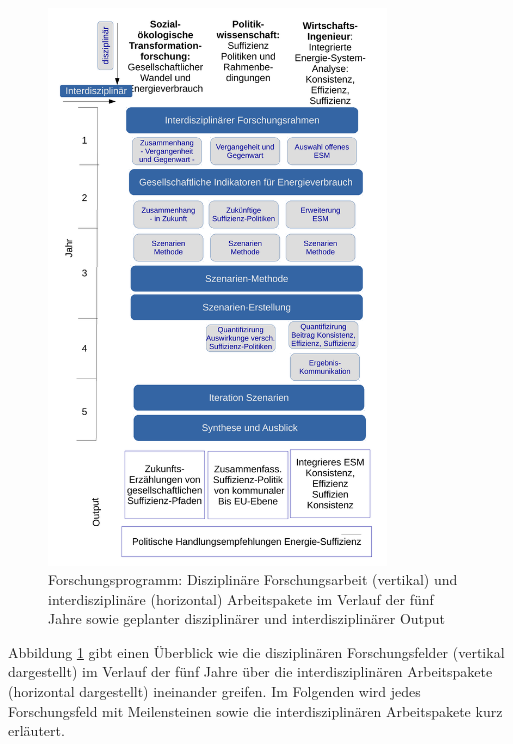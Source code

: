 \documentclass[a4paper,11pt,twoside]{scrartcl}
\begin{document}
\begin{figure}[!h]
    \centering
    \includegraphics[width=0.8\textwidth]{figures/Forschungsarbeit.pdf}
    \caption{Forschungsprogramm: Disziplinäre Forschungsarbeit (vertikal) und  interdisziplinäre (horizontal) Arbeitspakete im Verlauf der fünf Jahre sowie geplanter disziplinärer und interdisziplinärer Output}
    \label{fig:forschungsprogramm}
\end{figure}

Abbildung \ref{fig:forschungsprogramm} gibt einen Überblick wie die disziplinären Forschungsfelder (vertikal dargestellt) im Verlauf der fünf Jahre über die interdisziplinären Arbeitspakete (horizontal dargestellt) ineinander greifen. Im Folgenden wird jedes Forschungsfeld mit Meilensteinen sowie die interdisziplinären Arbeitspakete kurz erläutert.
\end{document}
